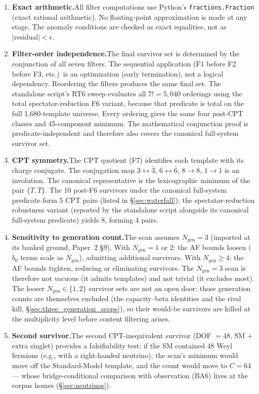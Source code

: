 \documentclass[11pt]{article}
\theoremstyle{definition}
\begin{document}
\begin{enumerate}[nosep]
\item \textbf{Exact arithmetic.}\quad All filter computations use
Python's \texttt{fractions.Fraction} (exact rational arithmetic).  No
floating-point approximation is made at any stage.  The anomaly
conditions are checked as exact equalities, not as
$|\text{residual}| < \epsilon$.

\item \textbf{Filter-order independence.}\quad The final survivor set
is determined by the conjunction of all seven filters.  The sequential
application (F1 before F2 before F3, etc.)\ is an optimization
(early termination), not a logical dependency.  Reordering the filters
produces the same final set.  The standalone script's RT6 sweep evaluates all
$7!=5{,}040$ orderings using the total spectator-reduction F6 variant,
because that predicate is total on the full 1{,}680-template universe.
Every ordering gives the same four post-CPT classes and 45-component
minimum.  The mathematical conjunction proof is predicate-independent
and therefore also covers the canonical full-system survivor set.

\item \textbf{CPT symmetry.}\quad The CPT quotient (F7) identifies
each template with its charge conjugate.  The conjugation map
$3 \leftrightarrow \bar{3}$, $6 \leftrightarrow \bar{6}$,
$8 \to 8$, $1 \to 1$ is an involution.  The canonical representative
is the lexicographic minimum of the pair $\{T, \overline{T}\}$.  The
10 post-F6 survivors under the canonical full-system predicate form 5
CPT pairs (listed in \S\ref{sec:waterfall}); the spectator-reduction
robustness variant (reported by the standalone script alongside its
canonical full-system predicate) yields 8, forming 4 pairs.

\item \textbf{Sensitivity to generation count.}\quad The scan assumes
$N_{\mathrm{gen}} = 3$ (imported at its banked ground, Paper~2 \S9).  With
$N_{\mathrm{gen}} = 1$ or $2$: the AF bounds loosen ($b_0$ terms
scale as $N_{\mathrm{gen}}$), admitting additional survivors.  With
$N_{\mathrm{gen}} \ge 4$: the AF bounds tighten, reducing or
eliminating survivors.  The $N_{\mathrm{gen}} = 3$ scan is therefore
not vacuous (it admits templates) and not trivial (it excludes most).  The looser $N_{\mathrm{gen}} \in \{1,2\}$ survivor sets are not an open door: those generation counts are themselves excluded (the capacity--beta identities and the rival kill, \S\ref{sec:three_generation_scope}), so their would-be survivors are killed at the multiplicity level before content filtering arises.

\item \textbf{Second survivor.}\quad The second CPT-inequivalent
survivor (DOF $= 48$, SM $+$ extra singlet) provides a
falsifiability test: if the SM contained 48 Weyl fermions (e.g., with
a right-handed neutrino), the scan's minimum would move off the
Standard-Model template, and the count would move to $C = 64$ ---
whose bridge-conditional comparison with observation (BA6) lives at
the corpus homes (\S\ref{sec:neutrinos}).
\end{enumerate}
\end{document}
